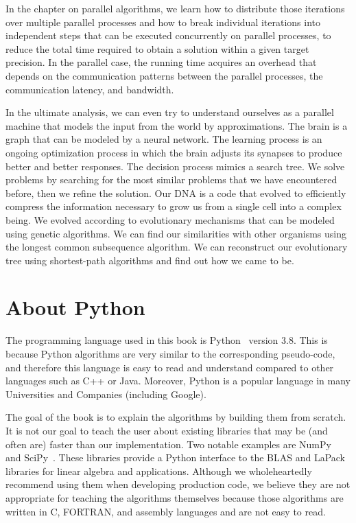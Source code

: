 \documentclass[justified, sixbynine]{tufte-book}
\theoremstyle{plain}%
\newtheorem * {corollary}{Corollary}
\theoremstyle{definition}
\theoremstyle{remark}
\newtheorem * {remark}{Remark}
\newtheorem * {note}{Note}
\begin{document}
\begin{fullwidth}
In the chapter on parallel algorithms, we learn how to distribute those iterations over multiple parallel processes and how to break individual iterations into independent steps that can be executed concurrently on parallel processes, to reduce the total time required to obtain a solution within a given target precision. In the parallel case, the running time acquires an overhead that depends on the communication patterns between the parallel processes, the communication latency, and bandwidth.

In the ultimate analysis, we can even try to understand ourselves as a parallel machine that models the input from the world by approximations. The brain is a graph that can be modeled by a neural network. The learning process is an ongoing optimization process in which the brain adjusts its synapses to produce better and better responses. The decision process mimics a search tree. We solve problems by searching for the most similar problems that we have encountered before, then we refine the solution. Our DNA is a code that evolved to efficiently compress the information necessary to grow us from a single cell into a complex being. We evolved according to evolutionary mechanisms that can be modeled using genetic algorithms. We can find our similarities with other organisms using the longest common subsequence algorithm. We can reconstruct our evolutionary tree using shortest-path algorithms and find out how we came to be.

\section{About Python}

The programming language used in this book is Python~\cite{python} version 3.8. This is because Python algorithms are very similar to the corresponding pseudo-code, and therefore this language is easy to read and understand compared to other languages such as C++ or Java. Moreover, Python is a popular language in many Universities and Companies (including Google).

The goal of the book is to explain the algorithms by building them from scratch. It is not our goal to teach the user about existing libraries that may be (and often are) faster than our implementation. Two notable examples are NumPy~\cite{numpy} and SciPy~\cite{scipy}. These libraries provide a Python interface to the BLAS and LaPack libraries for linear algebra and applications. Although we wholeheartedly recommend using them when developing production code, we believe they are not appropriate for teaching the algorithms themselves because those algorithms are written in C, FORTRAN, and assembly languages and are not easy to read.


\end{fullwidth}
\end{document}

